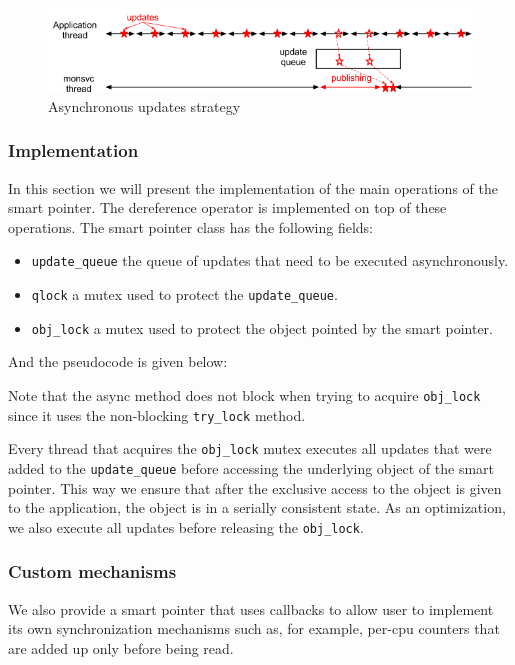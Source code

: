 \begin{figure}[ht!]
\centering
\includegraphics[scale=0.6]{Images/async_after.png}
\caption{Asynchronous updates strategy}
\label{fig:async_ptr}
\end{figure}

\subsubsection*{Implementation}

In this section we will present the implementation of the main operations of the smart pointer. The dereference operator is implemented on top of these operations. The smart pointer class has the following fields:
\begin{itemize}
\item {\tt update\_queue} the queue of updates that need to be executed asynchronously.
\item {\tt qlock} a mutex used to protect the {\tt update\_queue}.
\item {\tt obj\_lock} a mutex used to protect the object pointed by the smart pointer.
\end{itemize}
And the pseudocode is given below:

Note that the async method does not block when trying to acquire {\tt obj\_lock} since it uses the non-blocking {\tt try\_lock} method. 

Every thread that acquires the {\tt obj\_lock} mutex executes all updates that were added to the {\tt update\_queue} before accessing the underlying object of the smart pointer. This way we ensure that after the exclusive access to the object is given to the application, the object is in a serially consistent state. As an optimization, we also execute all updates before releasing the {\tt obj\_lock}.

\subsubsection*{Custom mechanisms}

We also provide a smart pointer that uses callbacks to allow user to implement its own synchronization mechanisms such as, for example, per-cpu counters that are added up only before being read.
